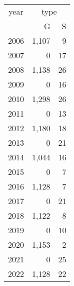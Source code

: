 \footnotesize\begin{tabular}[t]{lrr}
\toprule
\multicolumn{1}{c}{year} & \multicolumn{2}{c}{type} \\
\cmidrule(l{3pt}r{3pt}){1-1} \cmidrule(l{3pt}r{3pt}){2-3}
  & G & S\\
\midrule
2006 & 1,107 & 9\\
2007 & 0 & 17\\
2008 & 1,138 & 26\\
2009 & 0 & 16\\
2010 & 1,298 & 26\\
2011 & 0 & 13\\
2012 & 1,180 & 18\\
2013 & 0 & 21\\
2014 & 1,044 & 16\\
2015 & 0 & 7\\
2016 & 1,128 & 7\\
2017 & 0 & 21\\
2018 & 1,122 & 8\\
2019 & 0 & 10\\
2020 & 1,153 & 2\\
2021 & 0 & 25\\
2022 & 1,128 & 22\\
\bottomrule
\end{tabular}

